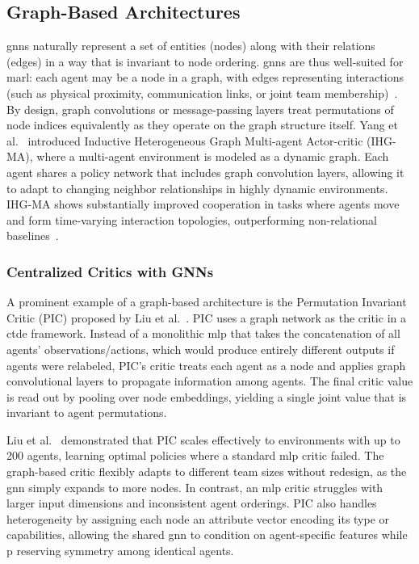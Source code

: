 \subsection{Graph-Based Architectures}

\Glspl{gnn} naturally represent a set of entities (nodes) along with 
their relations (edges) in a way that is invariant to node ordering. 
\Glspl{gnn} are thus well-suited for \gls{marl}: each agent may be a node in a graph, 
with edges representing interactions (such as physical proximity, 
communication links, or joint team membership)~\cite{liu2020b}. 
By design, graph convolutions or message-passing layers treat permutations of 
node indices equivalently as they operate on the graph structure itself. 
Yang et al.~\cite{yang2021a} introduced Inductive Heterogeneous Graph Multi-agent 
Actor-critic (IHG-MA), where a multi-agent environment is modeled as a dynamic graph. 
Each agent shares a policy network that includes graph convolution layers, 
allowing it to adapt to changing neighbor relationships in highly dynamic environments. 
IHG-MA shows substantially improved cooperation in tasks where agents move and form time-varying 
interaction topologies, outperforming non-relational baselines~\cite{yang2021a}. 

\subsubsection{Centralized Critics with GNNs}
A prominent example of a graph-based architecture is the Permutation 
Invariant Critic (PIC) proposed by Liu et al.~\cite{liu2020b}. 
PIC uses a graph network as the critic in a \gls{ctde} framework. 
Instead of a monolithic \gls{mlp} that takes the concatenation of 
all agents' observations/actions, which would produce entirely different 
outputs if agents were relabeled, PIC's critic treats each agent as a node 
and applies graph convolutional layers to propagate information among agents. 
The final critic value is read out by pooling over node embeddings, 
yielding a single joint value that is invariant to agent permutations. 

Liu et al.~\cite{liu2020b} demonstrated that PIC scales effectively 
to environments with up to 200 agents, learning optimal policies where 
a standard \gls{mlp} critic failed. The graph-based critic flexibly adapts to 
different team sizes without redesign, as the \gls{gnn} simply expands to more nodes. 
In contrast, an \gls{mlp} critic struggles with larger input dimensions 
and inconsistent agent orderings. PIC also handles heterogeneity by 
assigning each node an attribute vector encoding its type or capabilities, 
allowing the shared \gls{gnn} to condition on agent-specific features while p
reserving symmetry among identical agents.

